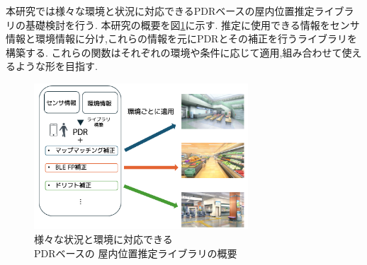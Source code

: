 本研究では様々な環境と状況に対応できるPDRベースの屋内位置推定ライブラリの基礎検討を行う.
本研究の概要を図\ref{fig:overview}に示す.
推定に使用できる情報をセンサ情報と環境情報に分け,これらの情報を元にPDRとその補正を行うライブラリを構築する.
これらの関数はそれぞれの環境や条件に応じて適用,組み合わせて使えるような形を目指す.
\begin{figure}[h]
	\centering
	\includegraphics[width=80mm]{image/first.png}
	\caption{様々な状況と環境に対応できる\\PDRベースの
		屋内位置推定ライブラリの概要}    \label{fig:overview}
\end{figure}
